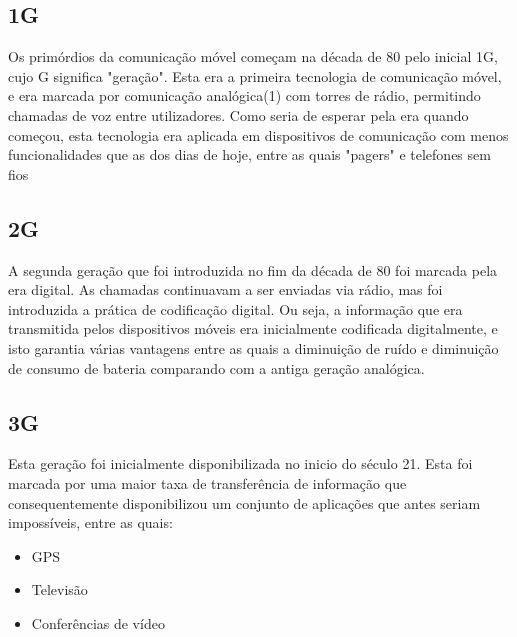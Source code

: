 \documentclass{llncs}
\begin{document}
\subsection{1G}
\hspace*{1.5em}Os primórdios da comunicação móvel começam na década de 80 pelo inicial 1G, cujo G significa "geração". Esta era a primeira tecnologia de comunicação móvel, e era marcada por comunicação analógica(1) com torres de rádio, permitindo chamadas de voz entre utilizadores. Como seria de esperar pela era quando começou, esta tecnologia era aplicada em dispositivos de comunicação com menos funcionalidades que as dos dias de hoje, entre as quais "pagers" e telefones sem fios \cite{Ton:Pan:Kus}

\subsection{2G}
\hspace*{1.5em}A segunda geração que foi introduzida no fim da década de 80 \cite{Ton:Pan:Kus} foi marcada pela era digital. As chamadas continuavam a ser enviadas via rádio, mas foi introduzida a prática de codificação digital. Ou seja, a informação que era transmitida pelos dispositivos móveis era inicialmente codificada digitalmente, e isto garantia várias vantagens entre as quais a diminuição de ruído e diminuição de consumo de bateria comparando com a antiga geração analógica.

\subsection{3G}
\hspace*{1.5em}Esta geração foi inicialmente disponibilizada no inicio do século 21. Esta foi marcada por uma maior taxa de transferência de informação que consequentemente disponibilizou um conjunto de aplicações que antes seriam impossíveis, entre as quais:
\begin{itemize}
    \item GPS
    \item Televisão
    \item Conferências de vídeo
\end{itemize}
\end{document}

